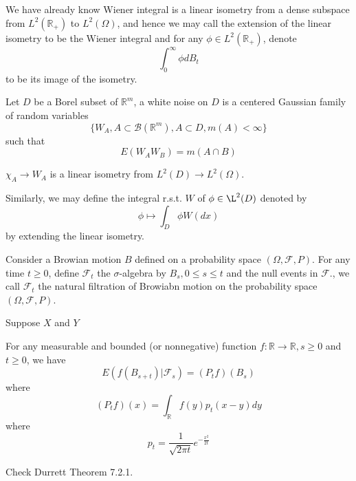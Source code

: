 \documentclass[lang=en, color=blue, ]{elegantbook}
\newcommand{\F}{\mathcal{F}}
\newcommand{\R}{\mathbb{R}}
\begin{document}
\begin{definition}
    We have already know Wiener integral is a linear isometry from a dense subspace from $L^2(\R_+)$ to $L^2(\Omega)$, and hence we may call the extension of the linear isometry to be the Wiener integral and for any $\phi \in L^2(\R_+)$, denote
    \[\int_0^{\infty} \phi dB_t\]
    to be its image of the isometry.
\end{definition}

\begin{definition}
    Let $D$ be a Borel subset of $\R^m$, a white noise on $D$ is a centered Gaussian family of random variables
    \[\{W_A, A\subset \mathcal{B}(\R^m),A\subset D, m(A)<\infty\}\]
    such that
    \[E(W_AW_B) = m(A\cap B)\]
\end{definition}

\begin{proposition}
    $\chi_A \to W_A$ is a linear isometry from $L^2(D)\to L^2(\Omega)$.
\end{proposition}

\begin{definition}
    Similarly, we may define the integral r.s.t. $W$ of $\phi\in\L^2(D)$ denoted by
    \[\phi \mapsto \int_D \phi W(dx)\]
    by extending the linear isometry.
\end{definition}

\begin{definition}
    Consider a Browian motion $B$ defined on a probability space $(\Omega,\F,P)$. For any time $t\geq 0$, define $\F_t$ the $\sigma$-algebra by $B_s, 0 \leq s \leq t$ and the null events in $\F$., we call $\F_t$ the natural filtration of Browiabn motion on the probability space $(\Omega, \F,P)$. 
\end{definition}

\begin{lemma}
    Suppose $X$ and $Y$
\end{lemma}

\begin{theorem}
    For any measurable and bounded (or nonnegative) function $f:\R\to\R, s\geq 0$ and $t\geq 0$, we have
    \[E(f(B_{s+t})|\F_s) = (P_tf)(B_s)\]
    where
    \[
    (P_tf)(x) = \int_{\R}f(y)p_t(x-y)dy
    \]
    where
    \[
    p_t = \dfrac{1}{\sqrt{2\pi t}} e^{-\tfrac{x^2}{2t}}
    \]
\end{theorem}
Check Durrett Theorem 7.2.1.
\end{document}
